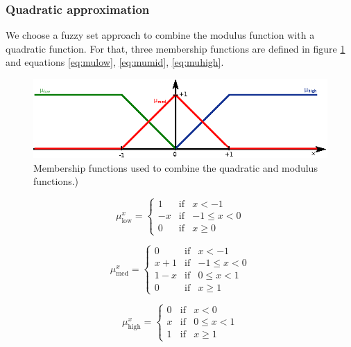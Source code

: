 \subsubsection{Quadratic approximation}
We choose a fuzzy set approach to combine the modulus function with a quadratic function. For that, three membership functions are defined in figure \ref{fig:fuzzy} and equations \ref{eq:mulow}, \ref{eq:mumid}, \ref{eq:muhigh}.

\begin{figure}[h!]
	\centering
	\includegraphics[width=0.7\linewidth]{modulus/images/fuzzy}
	\caption{Membership functions used to combine the quadratic and modulus functions.)}
	\label{fig:fuzzy}
\end{figure}

\begin{equation}
\label{eq:mulow}
\mu^x_{\text{low}}= \left\{ \begin{array}{lcc}
1 &   \text{if}  & x < -1 \\
-x & \text{if}  & -1 \leq x < 0 \\
0 &  \text{if} & x \geq 0
\end{array}
\right.
\end{equation}

\begin{equation}
\label{eq:mumid}
\mu^x_{\text{med}}= \left\{ \begin{array}{lcc}
0 &   \text{if}  & x < -1 \\
x+1 & \text{if}  & -1 \leq x < 0 \\
1-x & \text{if}  & 0 \leq x < 1 \\
0 &  \text{if} & x \geq 1
\end{array}
\right.
\end{equation}

\begin{equation}
\label{eq:muhigh}
\mu^x_{\text{high}}= \left\{ \begin{array}{lcc}
0 &   \text{if}  & x < 0 \\
x & \text{if}  & 0 \leq x < 1 \\
1 &  \text{if} & x \geq 1
\end{array}
\right.
\end{equation}

